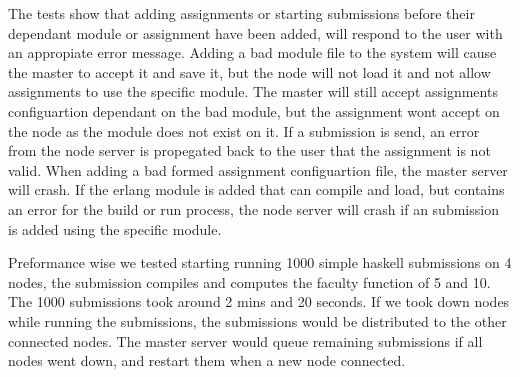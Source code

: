 The tests show that adding assignments or starting submissions before their dependant module or assignment have been added, will respond to the user with an appropiate error message. Adding a bad module file to the system will cause the master to accept it and save it, but the node will not load it and not allow assignments to use the specific module. The master will still accept assignments configuartion dependant on the bad module, but the assignment wont accept on the node as the module does not exist on it. If a submission is send, an error from the node server is propegated back to the user that the assignment is not valid. When adding a bad formed assignment configuartion file, the master server will crash. If the erlang module is added that can compile and load, but contains an error for the build or run process, the node server will crash if an submission is added using the specific module.

Preformance wise we tested starting running 1000 simple haskell submissions on 4 nodes, the submission compiles and computes the faculty function of 5 and 10. The 1000 submissions took around 2 mins and 20 seconds. If we took down nodes while running the submissions, the submissions would be distributed to the other connected nodes. The master server would queue remaining submissions if all nodes went down, and restart them when a new node connected.
